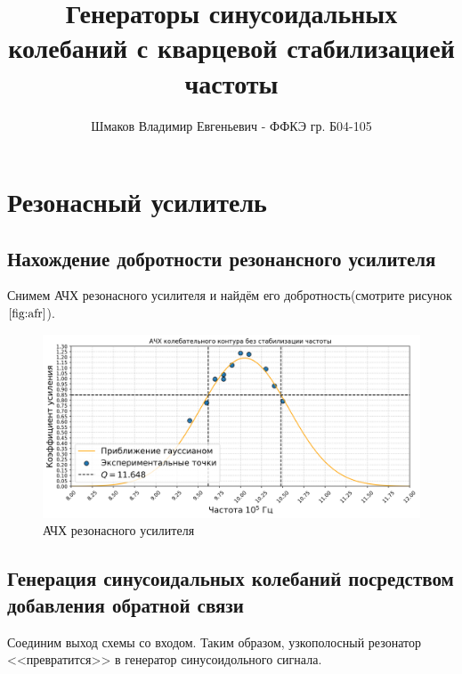 \documentclass[a4paper, 14pt]{extarticle}
\title{\textcolor{main_title}{Генераторы синусоидальных колебаний с кварцевой стабилизацией частоты}}
\author{Шмаков Владимир Евгеньевич - ФФКЭ гр. Б04-105}
\begin{document}
\maketitle



\section*{\textcolor{header}{Резонасный усилитель}}

\subsection*{\textcolor{sub_header}{Нахождение добротности резонансного усилителя}}


Снимем АЧХ резонасного усилителя и найдём его добротность(смотрите рисунок $\ref{fig:afr}$).
\begin{figure}[htbp]
    \centering
\includegraphics[width = 1 \textwidth]{afr.png}
    \caption{АЧХ резонасного усилителя}
    \label{fig:afr}
\end{figure}

\subsection*{\textcolor{sub_header}{Генерация синусоидальных колебаний посредством добавления обратной связи}}

Соединим выход схемы со входом. Таким образом, узкополосный резонатор <<превратится>> в генератор синусоидольного 
сигнала. 
\end{document}

